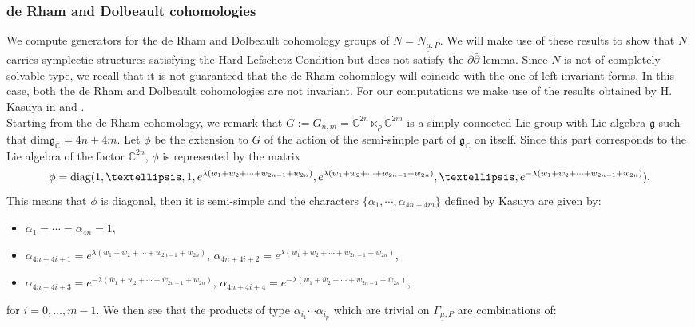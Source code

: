 \documentclass[a4paper, 11pt]{amsart}
\theoremstyle{plain}
\theoremstyle{definition}
\newcommand{\del}{\partial}
\newcommand{\delbar}{\bar{\partial}}
\newcommand{\C}{\mathbb{C}}
\numberwithin{equation}{section}
\begin{document}
\subsubsection{de Rham and Dolbeault cohomologies} We compute generators for the de Rham and Dolbeault cohomology groups of $N = N_{\underline{\mu}, P}$. We will make use of these results to show that $N$ carries symplectic structures satisfying the Hard Lefschetz Condition but does not satisfy the $\del\delbar$-lemma. Since $N$ is not of completely solvable type, we recall that it is not guaranteed that the de Rham cohomology will coincide with the one of left-invariant forms. In this case, both the de Rham and Dolbeault cohomologies are not invariant. For our computations we make use of the results obtained by H. Kasuya in \cite{Kasuya2} and \cite{Kasuya}.\\[5pt]
Starting from the de Rham cohomology, we remark that $G := G_{n,m} = \mathbb{C}^{2n} \ltimes_{\rho} \mathbb{C}^{2m}$ is a simply connected Lie group with Lie algebra $\mathfrak{g}$ such that $\text{dim}\mathfrak{g}_{\C} = 4n+4m$. Let $\phi$ be the extension to $G$ of the action of the semi-simple part of $\mathfrak{g}_{\C}$ on itself. Since this part corresponds to the Lie algebra of the factor $\C^{2n}$, $\phi$ is represented by the matrix
\[\phi = \hbox{diag}(1,\ldots, 1, e^{\lambda(w_{1} + \bar w_{2} + \cdots + w_{2n-1} + \bar w_{2n})}, e^{\lambda(\bar w_{1} + w_{2} + \cdots + \bar w_{2n-1} + w_{2n})}, \ldots, e^{-\lambda(w_{1} + \bar w_{2} + \cdots + \bar w_{2n-1} + \bar w_{2n})}).\]
This means that $\phi$ is diagonal, then it is semi-simple and the characters $\{\alpha_{1}, \cdots, \alpha_{4n+4m}\}$ defined by Kasuya are given by:
\begin{itemize}
    \item $\alpha_{1} = \cdots = \alpha_{4n} = 1$,\\[1pt]
    \item $\alpha_{4n+4i+1} = e^{\lambda(w_{1} + \bar w_{2} + \cdots + w_{2n-1} + \bar w_{2n})}$, $\alpha_{4n+4i+2} = e^{ \lambda(\bar w_{1} + w_{2} + \cdots + \bar w_{2n-1} + w_{2n})}$,\\[1pt]
    \item $\alpha_{4n+4i+3} = e^{-\lambda(\bar w_{1} + w_{2} + \cdots + \bar w_{2n-1} + w_{2n})}$, $\alpha_{4n+4i+4} = e^{-\lambda(w_{1} + \bar w_{2} + \cdots + w_{2n-1} + \bar w_{2n})}$,
\end{itemize}
for $i = 0, \ldots, m-1$. We then see that the products of type $\alpha_{i_{1}} \cdots \alpha_{i_{p}}$ which are trivial on $\Gamma_{\underline{\mu}, P} $ are combinations of:
\end{document}
